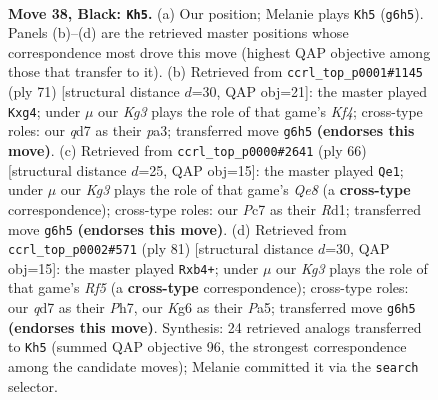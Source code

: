 \documentclass[11pt]{article}
\begin{document}
\clearpage

\begin{figure}[p]\centering
\begin{subfigure}{0.46\textwidth}\centering
\resizebox{\linewidth}{!}{%
\newchessgame
\chessboard[
  setfen={8/2pQ1R2/6kp/8/5P2/8/6P1/R5K1 b - - 0 38},
  showmover=false,
  pgfstyle=straightmove, color=movearrow, markmove={g6-h5}
]}
\caption{}
\end{subfigure}\hfill
\begin{subfigure}{0.46\textwidth}\centering
\resizebox{\linewidth}{!}{%
\newchessgame
\chessboard[
  setfen={8/8/4p3/p3Pk2/6R1/P7/6KP/8 b - - 0 36},
  showmover=false,
  pgfstyle=straightmove, color=movearrow, markmove={f5-g4}
]}
\caption{}
\end{subfigure}
\\[4pt]
\begin{subfigure}{0.46\textwidth}\centering
\resizebox{\linewidth}{!}{%
\newchessgame
\chessboard[
  setfen={4Q3/5r1k/5qp1/8/8/7P/6P1/3R3K w - - 4 34},
  showmover=false,
  pgfstyle=straightmove, color=movearrow, markmove={e8-e1}
]}
\caption{}
\end{subfigure}\hfill
\begin{subfigure}{0.46\textwidth}\centering
\resizebox{\linewidth}{!}{%
\newchessgame
\chessboard[
  setfen={8/4kp1p/2P5/p7/1R3r2/8/1KR3P1/8 b - - 0 41},
  showmover=false,
  pgfstyle=straightmove, color=movearrow, markmove={f4-b4}
]}
\caption{}
\end{subfigure}
\caption{\textbf{Move 38, Black: \texttt{Kh5}.} (a) Our position; Melanie plays \texttt{Kh5} (\texttt{g6h5}). Panels (b)--(d) are the retrieved master positions whose correspondence most drove this move (highest QAP objective among those that transfer to it). (b) Retrieved from \texttt{ccrl\_top\_p0001\#1145} (ply 71) [structural distance $d$=30, QAP obj=21]: the master played \texttt{Kxg4}; under $\mu$ our \emph{Kg3} plays the role of that game's \emph{Kf4}; cross-type roles: our \emph{q}d7 as their \emph{p}a3; transferred move \texttt{g6h5} \textbf{(endorses this move)}. (c) Retrieved from \texttt{ccrl\_top\_p0000\#2641} (ply 66) [structural distance $d$=25, QAP obj=15]: the master played \texttt{Qe1}; under $\mu$ our \emph{Kg3} plays the role of that game's \emph{Qe8} (a \textbf{cross-type} correspondence); cross-type roles: our \emph{P}c7 as their \emph{R}d1; transferred move \texttt{g6h5} \textbf{(endorses this move)}. (d) Retrieved from \texttt{ccrl\_top\_p0002\#571} (ply 81) [structural distance $d$=30, QAP obj=15]: the master played \texttt{Rxb4+}; under $\mu$ our \emph{Kg3} plays the role of that game's \emph{Rf5} (a \textbf{cross-type} correspondence); cross-type roles: our \emph{q}d7 as their \emph{P}h7, our \emph{K}g6 as their \emph{P}a5; transferred move \texttt{g6h5} \textbf{(endorses this move)}. Synthesis: 24 retrieved analogs transferred to \texttt{Kh5} (summed QAP objective 96, the strongest correspondence among the candidate moves); Melanie committed it via the \texttt{search} selector.}
\label{fig:thought-m75}
\end{figure}
\end{document}

